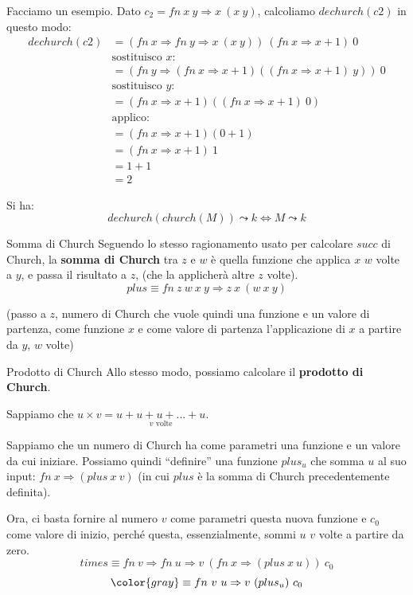 \documentclass[a4paper,11pt]{report}
\begin{document}
Facciamo un esempio. Dato \( c_2 = fn \ x \ y \Rightarrow x \ (x \ y ) \), calcoliamo \( dechurch(c2) \) in questo modo:
\begin{align*}
    dechurch(c2) &= (fn\ x \Rightarrow fn \ y \Rightarrow x \ (x \ y)) \ (fn \ x \Rightarrow x+1) \ 0 \\
    & \text{sostituisco } x: \\
    &= (fn\ y \Rightarrow (fn\ x \Rightarrow x+1) ((fn\ x \Rightarrow x+1) \ y)) \ 0 \\
    & \text{sostituisco } y: \\
    &= (fn\ x \Rightarrow x+1) ((fn\ x \Rightarrow x+1) \ 0) \\
    & \text{applico:} \\
    &= (fn\ x \Rightarrow x+1) (0+1) \\
    &= (fn\ x \Rightarrow x+1) \ 1 \\
    &= 1+1 \\
    &= 2
\end{align*}

\begin{thmframe}{}{}
    Si ha:
    \[ dechurch(church(M)) \leadsto k \iff M \leadsto k \]
\end{thmframe}

\begin{defframe}{Somma di Church}{}
    Seguendo lo stesso ragionamento usato per calcolare \( succ \) di Church, la \textbf{somma di Church} tra \( z\) e \( w \) è quella funzione che applica \( x\) \( w\) volte a \( y \), e passa il risultato a \( z \), (che la applicherà altre \( z \) volte).
    \[ plus \equiv fn \ z \ w \ x \ y \Rightarrow z \ x \ (w \ x \ y)\]

    (passo a \( z \), numero di Church che vuole quindi una funzione e un valore di partenza, come funzione \( x \) e come valore di partenza l'applicazione di \( x \) a partire da \( y \), \( w \) volte)

\end{defframe}

\begin{defframe}{Prodotto di Church}{}
    Allo stesso modo, possiamo calcolare il \textbf{prodotto di Church}.

    Sappiamo che \( u \times v = \underset{v \text{ volte}}{u + u + u + ... + u} \).

    Sappiamo che un numero di Church ha come parametri una funzione e un valore da cui iniziare. Possiamo quindi ``definire'' una funzione \( plus_u \) che somma \( u \) al suo input: \( fn \ x \Rightarrow (plus \ x \ v) \) (in cui \( plus \) è la somma di Church precedentemente definita).

    Ora, ci basta fornire al numero \( v \) come parametri questa nuova funzione e \( c_0 \) come valore di inizio, perché questa, essenzialmente, sommi \( u \) \( v \) volte a partire da zero.
    \[ times \equiv fn \ v \Rightarrow fn \ u \Rightarrow v \ (fn \ x \Rightarrow (plus \ x \ u) ) \ c_0 \]
    \[\color{gray} \equiv fn \ v  \ u \Rightarrow v \ (plus_u)  \ c_0 \]
\end{defframe}
\end{document}

